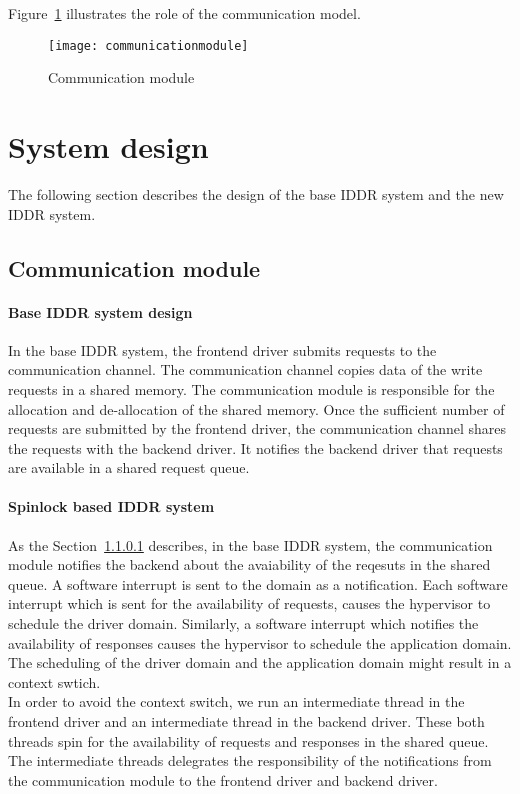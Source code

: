 Figure~\ref{fig:communication} illustrates the role of the communication model. 
\begin{figure}[!ht]
\centering
\texttt{[image: communicationmodule]}
\caption{Communication module}
\label{fig:communication}
\end{figure}

\section{System design}\label{design}

The following section describes the design of the base IDDR system and the new IDDR system. 

\subsection{Communication module}

\paragraph{Base IDDR system design}
\label{par:base IDDR communication}
In the base IDDR system, the frontend driver submits requests to the communication channel. The communication channel copies data of the write requests in a shared memory. The communication module is responsible for the allocation and de-allocation of the shared memory. Once the sufficient number of requests are submitted by the frontend driver, the communication channel shares the requests with the backend driver. It notifies the backend driver that requests are available in a shared request queue.

\paragraph{Spinlock based IDDR system}
\label{par:spin IDDR communication}
As the Section~\ref{par:base IDDR communication} describes, in the base IDDR system, the communication module notifies the backend about the avaiability of the reqesuts in the shared queue. A software interrupt is sent to the domain as a notification. Each software interrupt which is sent for the availability of requests, causes the hypervisor to schedule the driver domain. Similarly, a software interrupt which notifies the availability of responses causes the hypervisor to schedule the application domain. The scheduling of the driver domain and the application domain might result in a context swtich. 
\\[3mm]
In order to avoid the context switch, we run an intermediate thread in the frontend driver and an intermediate thread in the backend driver. These both threads spin for the availability of requests and responses in the shared queue. The intermediate threads delegrates the responsibility of the notifications from the communication module to the frontend driver and backend driver. 

